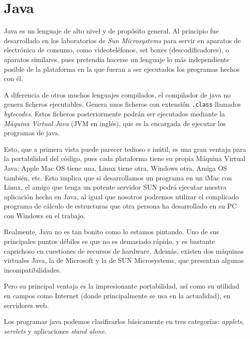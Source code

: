 
\chapter{Java}
\label{java.tex}

Java es un lenguaje de alto nivel y de propósito general. Al principio
fue desarrollado  en los laboratorios  de {\em Sun  Microsystems} para
servir en aparatos de electrónica de consumo, como videoteléfonos, set
boxes (descodificadores), o aparatos similares, pues pretendía hacerse
un lenguaje  lo más independiente posible  de la plataforma en  la que
fueran a ser ejecutados los programas hechos con él.

A  diferencia  de otros  muchos  lenguajes  compilados, el  compilador
de  java no  genera  ficheros ejecutables.  Genera  unos ficheros  con
extensión  {\tt  .class}  llamados  {\em  bytecodes}.  Estos  ficheros
posteriormente podrán ser ejecutados  mediante la {\em Máquina Virtual
Java} (JVM en  inglés), que es la encargada de  ejecutar los programas
de java.

Esto, que a primera vista puede  parecer tedioso e inútil, es una gran
ventaja para la portabilidad del código, pues cada plataforma tiene su
propia Máquina Virtual Java: Apple Mac OS tiene una, Linux tiene otra,
Windows otra, Amiga OS también, etc. Esto implica que si desarrollamos
un  programa en  un iMac  con  Linux, el  amigo que  tenga un  potente
servidor SUN podrá ejecutar nuestra aplicación hecha en Java, al igual
que nosotros  podremos utilizar el  complicado programa de  cálculo de
estructuras que otra  persona ha desarrollado en su PC  con Windows en
el trabajo.

Realmente, Java no es tan bonito  como lo estamos pintando. Uno de sus
principales  puntos  débiles es  que  no  es  demasiado rápido,  y  es
bastante  caprichoso en  cuestiones de  recursos de  hardware. Además,
existen  dos máquinas  virtuales Java,  la de  Microsoft y  la de  SUN
Microsystems, que presentan algunas incompatibilidades.

Pero su principal  ventaja es la impresionante  portabilidad, así como
su utilidad en campos como Internet (donde principalmente se usa en la
actualidad), en servidores web.

Los  programas   java  podemos   clasificarlos  básicamente   en  tres
categorías: {\em  applets}, {\em  servlets} y aplicaciones  {\em stand
alone}.

